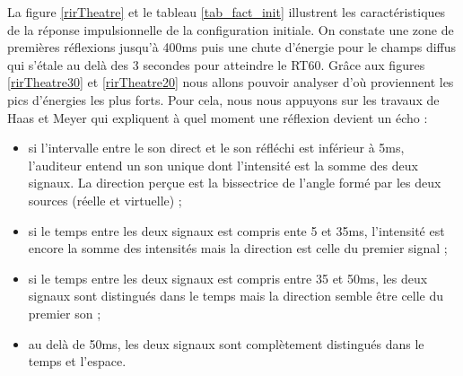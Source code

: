 La figure \ref{rirTheatre} et le tableau \ref{tab_fact_init} illustrent les caractéristiques de  la réponse impulsionnelle de la configuration initiale. On constate une zone de premières réflexions jusqu'à 400ms puis une chute d'énergie pour le champs diffus qui s'étale au delà des 3 secondes pour atteindre le \gls{RT60}. Grâce aux figures \ref{rirTheatre30} et \ref{rirTheatre20} nous allons pouvoir analyser d'où proviennent les pics d'énergies les plus forts. Pour cela, nous nous appuyons sur les travaux de Haas et Meyer \cite[p.49]{haas} qui expliquent à quel moment une réflexion devient un écho :
\begin{itemize}
\item si l'intervalle entre le son direct et le son réfléchi est inférieur à 5ms, l'auditeur entend un son unique dont l'intensité est la somme des deux signaux. La direction perçue est la bissectrice de l'angle formé par les deux sources (réelle et virtuelle) ;
\item si le temps entre les deux signaux est compris ente 5 et 35ms, l'intensité est encore la somme des intensités mais la direction est celle du premier signal ;
\item si le temps entre les deux signaux est compris entre 35 et 50ms, les deux signaux sont distingués dans le temps mais la direction semble être celle du premier son ;
\item au delà de 50ms, les deux signaux sont complètement distingués dans le temps et l'espace.
\end{itemize}

